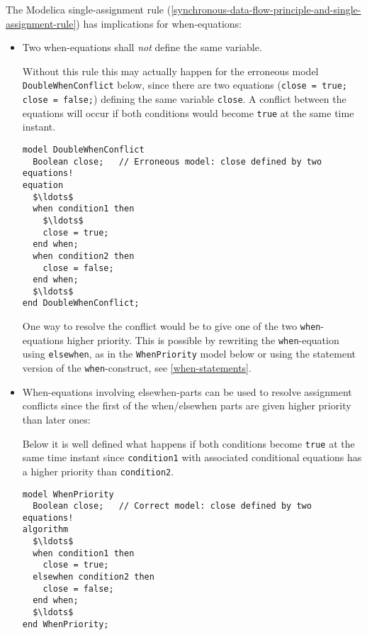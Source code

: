 The Modelica single-assignment rule (\cref{synchronous-data-flow-principle-and-single-assignment-rule}) has implications for
when-equations:
\begin{itemize}
\item
  Two when-equations shall \emph{not} define the same variable.

\begin{nonnormative}
Without this rule this may actually happen for the erroneous
model \lstinline!DoubleWhenConflict! below, since there are two equations
(\lstinline!close = true; close = false;!) defining the same variable
\lstinline!close!. A conflict between the equations will occur if both
conditions would become \lstinline!true! at the same time instant.
\begin{lstlisting}[language=modelica]
model DoubleWhenConflict
  Boolean close;   // Erroneous model: close defined by two equations!
equation
  $\ldots$
  when condition1 then
    $\ldots$
    close = true;
  end when;
  when condition2 then
    close = false;
  end when;
  $\ldots$
end DoubleWhenConflict;
\end{lstlisting}

One way to resolve the conflict would be to give one of the two \lstinline!when!-equations higher priority.
This is possible by rewriting the \lstinline!when!-equation using \lstinline!elsewhen!, as in the \lstinline!WhenPriority! model below or using the statement version of the \lstinline!when!-construct, see \cref{when-statements}.
\end{nonnormative}

\item
  When-equations involving elsewhen-parts can be used to resolve
  assignment conflicts since the first of the when/elsewhen parts are
  given higher priority than later ones:
\begin{nonnormative}
Below it is well defined what happens if both conditions
become \lstinline!true! at the same time instant since \lstinline!condition1! with
associated conditional equations has a higher priority than \lstinline!condition2!.
\begin{lstlisting}[language=modelica]
model WhenPriority
  Boolean close;   // Correct model: close defined by two equations!
algorithm
  $\ldots$
  when condition1 then
    close = true;
  elsewhen condition2 then
    close = false;
  end when;
  $\ldots$
end WhenPriority;
\end{lstlisting}
\end{nonnormative}
\end{itemize}

